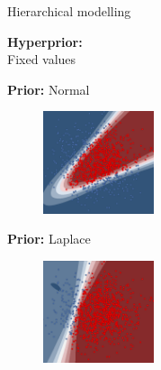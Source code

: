 \documentclass{beamer}
\begin{document}
\begin{frame}{Hierarchical modelling}
	\begin{minipage}[t]{0.32\columnwidth}
	\vspace{0.6cm}
	\textbf{Hyperprior:} \\Fixed values
	\end{minipage}
	\begin{minipage}[t]{0.32\columnwidth}
		\centering
		\textbf{Prior:} Normal
		\begin{figure}
			\includegraphics[height=3cm]{pres_pics/p_gauss.png}
		\end{figure}
	\end{minipage}
	\begin{minipage}[t]{0.32\columnwidth}
		\centering
		\textbf{Prior:} Laplace
		\vspace{-0.075cm}
		\begin{figure}
			\includegraphics[height=3cm]{pres_pics/p_laplace.png}
		\end{figure}
	\end{minipage}
	
	\vfill
	

\end{frame}
\end{document}
